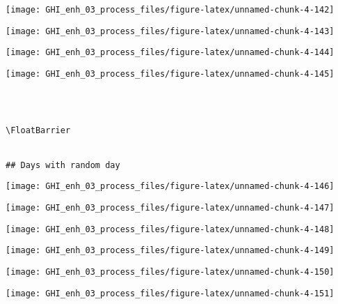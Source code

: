 \documentclass[
  10pt,
  a4paper,oneside]{article}
\begin{document}
\begin{center}\texttt{[image: GHI\_enh\_03\_process\_files/figure-latex/unnamed-chunk-4-142]} \end{center}

\begin{center}\texttt{[image: GHI\_enh\_03\_process\_files/figure-latex/unnamed-chunk-4-143]} \end{center}

\begin{center}\texttt{[image: GHI\_enh\_03\_process\_files/figure-latex/unnamed-chunk-4-144]} \end{center}

\begin{center}\texttt{[image: GHI\_enh\_03\_process\_files/figure-latex/unnamed-chunk-4-145]} \end{center}

\begin{verbatim}
 
 

\FloatBarrier


## Days with random day 
\end{verbatim}

\begin{center}\texttt{[image: GHI\_enh\_03\_process\_files/figure-latex/unnamed-chunk-4-146]} \end{center}

\begin{center}\texttt{[image: GHI\_enh\_03\_process\_files/figure-latex/unnamed-chunk-4-147]} \end{center}

\begin{center}\texttt{[image: GHI\_enh\_03\_process\_files/figure-latex/unnamed-chunk-4-148]} \end{center}

\begin{center}\texttt{[image: GHI\_enh\_03\_process\_files/figure-latex/unnamed-chunk-4-149]} \end{center}

\begin{center}\texttt{[image: GHI\_enh\_03\_process\_files/figure-latex/unnamed-chunk-4-150]} \end{center}

\begin{center}\texttt{[image: GHI\_enh\_03\_process\_files/figure-latex/unnamed-chunk-4-151]} \end{center}
\end{document}
